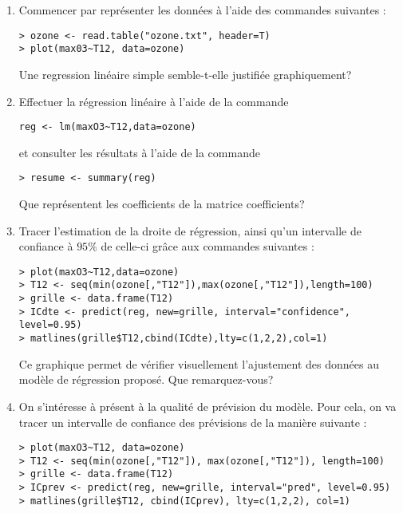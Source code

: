 \documentclass{td_um}
\providecommand{\1}{\mathds{1}}
\begin{document}
\begin{enumerate}
\item Commencer par représenter les données à l'aide des commandes suivantes :
\begin{verbatim}
> ozone <- read.table("ozone.txt", header=T)
> plot(max03~T12, data=ozone)
\end{verbatim}
Une regression linéaire simple semble-t-elle justifiée graphiquement?
\item Effectuer la régression linéaire à l'aide de la commande
\begin{verbatim}
reg <- lm(maxO3~T12,data=ozone)
\end{verbatim}
et consulter les résultats à l'aide de la commande
\begin{verbatim}
> resume <- summary(reg)
\end{verbatim}
Que représentent les coefficients de la matrice coefficients?
\item Tracer l'estimation de la droite de régression, ainsi qu'un intervalle de confiance à $95 \%$ de celle-ci grâce aux commandes suivantes :
\begin{verbatim}
> plot(maxO3~T12,data=ozone)
> T12 <- seq(min(ozone[,"T12"]),max(ozone[,"T12"]),length=100)
> grille <- data.frame(T12)
> ICdte <- predict(reg, new=grille, interval="confidence", level=0.95)
> matlines(grille$T12,cbind(ICdte),lty=c(1,2,2),col=1)
\end{verbatim}
Ce graphique permet de vérifier visuellement l'ajustement des données au modèle de régression proposé. Que remarquez-vous?
\item On s'intéresse à présent à la qualité de prévision du modèle. Pour cela, on va tracer un intervalle de confiance des prévisions de la manière suivante :
\begin{verbatim}
> plot(maxO3~T12, data=ozone)
> T12 <- seq(min(ozone[,"T12"]), max(ozone[,"T12"]), length=100)
> grille <- data.frame(T12)
> ICprev <- predict(reg, new=grille, interval="pred", level=0.95)
> matlines(grille$T12, cbind(ICprev), lty=c(1,2,2), col=1)
\end{verbatim}

\end{enumerate}
\end{document}
